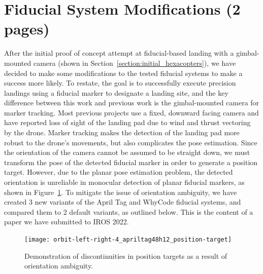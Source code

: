 \section{Fiducial System Modifications (2 pages)}
\label{section:fiducial_system_modifications}

After the initial proof of concept attempt at fiducial-based landing with a gimbal-mounted camera (shown in Section~\ref{section:initial_hexacopters}),
we have decided to make some modifications to the tested fiducial systems to make a success more likely.
To restate, the goal is to successfully execute precision landings using a fiducial marker to designate a landing site,
and the key difference between this work and previous work is the gimbal-mounted camera for marker tracking.
Most previous projects use a fixed, downward facing camera and have reported loss of sight of the landing pad due to
wind and thrust vectoring by the drone.
Marker tracking makes the detection of the landing pad more robust to the drone's movements,
but also complicates the pose estimation.
Since the orientation of the camera cannot be assumed to be straight down,
we must transform the pose of the detected fiducial marker in order to generate a position target.
However, due to the planar pose estimation problem, the detected orientation is unreliable in monocular detection of planar fiducial markers,
as shown in Figure~\ref{figure:discontinuities}.
To mitigate the issue of orientation ambiguity, we have created 3 new variants of the April Tag and WhyCode fiducial systems,
and compared them to 2 default variants, as outlined below.
This is the content of a paper we have submitted to IROS 2022.

\begin{figure}
    \centering
    \texttt{[image: orbit-left-right-4\_apriltag48h12\_position-target]}
    \caption{Demonstration of discontinuities in position targets as a result of orientation ambiguity.}
    \label{figure:discontinuities}
\end{figure}

